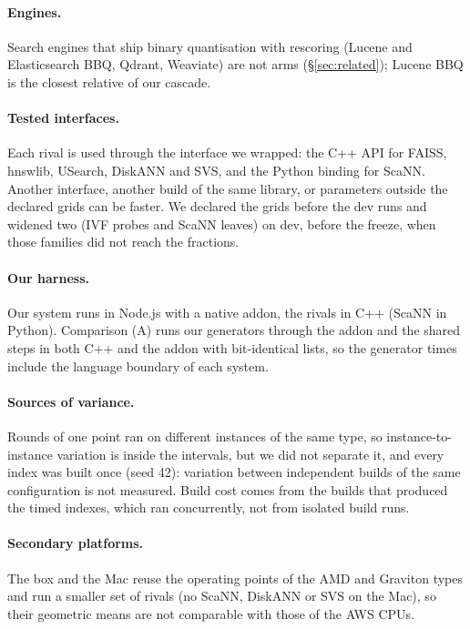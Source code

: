 \paragraph{Engines.} Search engines that ship binary quantisation with rescoring (Lucene and Elasticsearch BBQ,
Qdrant, Weaviate) are not arms (\S\ref{sec:related}); Lucene BBQ is the closest relative of our cascade.

\paragraph{Tested interfaces.} Each rival is used through the interface we wrapped: the C++ API for
FAISS, hnswlib, USearch, DiskANN and SVS, and the Python binding for ScaNN. Another interface,
another build of the same library, or parameters outside the declared grids can be faster. We
declared the grids before the dev runs and widened two (IVF probes and ScaNN leaves) on dev, before
the freeze, when those families did not reach the fractions.

\paragraph{Our harness.} Our system runs in Node.js with a native addon, the rivals in C++ (ScaNN in
Python). Comparison (A) runs our generators through the addon and the shared steps in both C++ and the
addon with bit-identical lists, so the generator times include the language boundary of each system.

\paragraph{Sources of variance.} Rounds of one point ran on different instances of the same type, so
instance-to-instance variation is inside the intervals, but we did not separate it, and every index
was built once (seed 42): variation between independent builds of the same configuration is not
measured. Build cost comes from the builds that produced the timed indexes, which ran concurrently,
not from isolated build runs.

\paragraph{Secondary platforms.} The box and the Mac reuse the operating points of the AMD and
Graviton types and run a smaller set of rivals (no ScaNN, DiskANN or SVS on the Mac), so their
geometric means are not comparable with those of the AWS CPUs.


